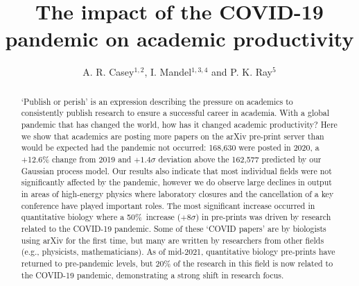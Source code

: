 \documentclass[]{rsos}%
\begin{document}
\title{The impact of the COVID-19 pandemic on academic productivity}

\author{%
A. R. Casey$^{1,2}$,  I. Mandel$^{1,3,4}$ and P. K. Ray$^{5}$}

\address{$^1$School of Physics \& Astronomy, Monash University, Clayton 3800, Victoria, Australia\\
$^2$ARC Centre of Excellence for Astrophysics in Three Dimensions (ASTRO-3D), Australia\\
$^3$OzGrav, Australian Research Council Centre of Excellence for Gravitational Wave Discovery, Australia\\
$^4$Institute of Gravitational Wave Astronomy and School of Physics and Astronomy, University of Birmingham, Birmingham, B15 2TT, United Kingdom\\
$^5$Department of Mathematics, Imperial College London, London, United Kingdom
}

\subject{xxxxx, xxxxx, xxxx}



\begin{abstract}
`Publish or perish’ is an expression describing the pressure on academics to consistently publish research to ensure a successful career in academia. 
With a global pandemic that has changed the world, how has it changed academic productivity? 
Here we show that academics are posting more papers on the arXiv pre-print server than would be expected had the pandemic not occurred: 168,630 were posted in 2020, a +12.6\% change from 2019 and $+1.4\sigma$ deviation above the 162,577 predicted by our Gaussian process model. Our results also indicate that most individual fields were not significantly affected by the pandemic, however we do observe large declines in output in areas of high-energy physics where laboratory closures and the cancellation of a key conference have played important roles. The most significant increase occurred in quantitative biology where a 50\%~increase ($+8\sigma$) in pre-prints was driven by research related to the COVID-19 pandemic.
Some of these `COVID papers' are by biologists using arXiv for the first time, but many are written by researchers from other fields (e.g., physicists, mathematicians). 
As of mid-2021, quantitative biology pre-prints have returned to pre-pandemic levels, but 20\% of the research in this field is now related to the COVID-19 pandemic, demonstrating a strong shift in research focus.
\end{abstract}
\end{document}

